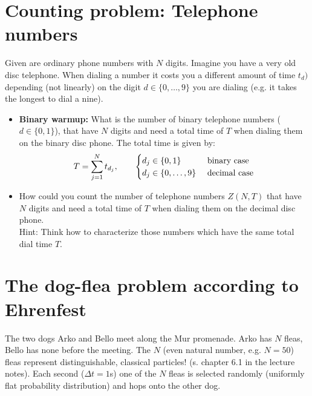 \documentclass[12pt,a4paper]{article} %
\begin{document}
 \section{Counting problem: Telephone numbers}
 Given are ordinary phone numbers with $N$ digits. Imagine you have a very old disc telephone. When dialing a number it costs you a different amount of time $t_d)$ depending (not linearly) on the digit $d \in \{0, \dots, 9\}$ you are dialing (e.g. it takes the longest to dial a nine).
 \begin{itemize}
 \item \textbf{Binary warmup:} What is the number of binary telephone numbers  ($d \in \{0,1\}$), that have $N$ digits and need a total time of $T$ when dialing them on the binary disc phone. The total time is given by:
 \begin{align}T = \sum_{j=1}^{N} t_{d_j}, \qquad \begin{cases} d_j \in \{0,1\} & \textnormal{ binary case} \\d_j \in \{0, \dots, 9\} & \textnormal{ decimal case} \end{cases}
\end{align}
                                                  

  \item  How could you count the number of telephone numbers $Z(N,T)$ that have $N$ digits and need a total time of $T$ when dialing them on the decimal disc phone.\\
  Hint: Think how to characterize those numbers which have the same total dial time $T$.
 \end{itemize}


 

 

 \section{The dog-flea problem according to Ehrenfest}
 The two dogs Arko and Bello meet along the Mur promenade.  Arko has $N$ fleas, Bello has none before the meeting. The $N$ (even natural number, e.g. $N = 50$) fleas represent distinguishable, classical particles! (s. chapter 6.1 in the lecture notes). Each second ($\Delta t = 1$s) one of the $N$ fleas is selected randomly (uniformly flat probability distribution) and hops onto the other dog. 
 
\end{document}
